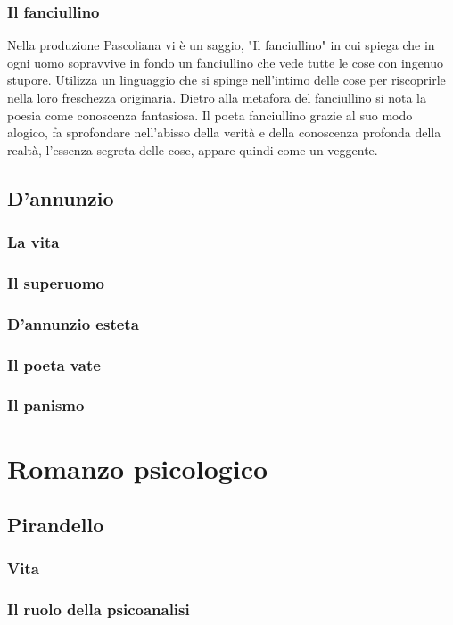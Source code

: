 \documentclass[12pt]{report}
\begin{document}
		\subsection[La poetica]{Il fanciullino}
		Nella produzione Pascoliana vi è un saggio, "Il fanciullino" in cui spiega che in ogni uomo sopravvive in fondo un fanciullino che vede tutte le cose con ingenuo stupore.
		Utilizza un linguaggio che si spinge nell'intimo delle cose per riscoprirle nella loro freschezza originaria.
		Dietro alla metafora del fanciullino si nota la poesia come conoscenza fantasiosa.
		Il poeta fanciullino grazie al suo modo alogico, fa sprofondare nell'abisso della verità e della conoscenza profonda della realtà, l'essenza segreta delle cose, appare quindi come un veggente.
		\section{D'annunzio}
			\subsection[Vita]{La vita}
			\subsection{Il superuomo}
			\subsection{D'annunzio esteta}
			\subsection{Il poeta vate}
			\subsection{Il panismo}
	
	\chapter{Romanzo psicologico}
	
	\section{Pirandello}
		\subsection{Vita}
		\subsection{Il ruolo della psicoanalisi}
\end{document}
